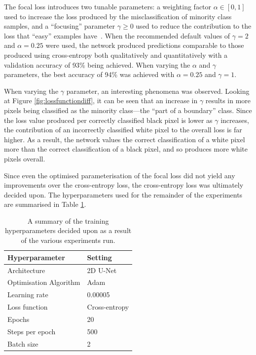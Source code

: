 The focal loss introduces two tunable parameters: a weighting factor $\alpha \in [0, 1]$ used to increase the loss produced by the misclassification of minority class samples, and a ``focusing'' parameter $\gamma \geq 0$ used to reduce the contribution to the loss that ``easy'' examples have~\cite{focalloss}. When the recommended default values of $\gamma=2$ and $\alpha=0.25$ were used, the network produced predictions comparable to those produced using cross-entropy both qualitatively and quantitatively with a validation accuracy of 93\% being achieved. When varying the $\alpha$ and $\gamma$ parameters, the best accuracy of 94\% was achieved with $\alpha=0.25$ and $\gamma=1$.

When varying the $\gamma$ parameter, an interesting phenomena was observed. Looking at Figure \ref{fig:lossfunctiondiff}, it can be seen that an increase in $\gamma$ results in more pixels being classified as the minority class---the ``part of a boundary'' class. Since the loss value produced per correctly classified black pixel is lower as $\gamma$ increases, the contribution of an incorrectly classified white pixel to the overall loss is far higher. As a result, the network values the correct classification of a white pixel more than the correct classification of a black pixel, and so produces more white pixels overall.

Since even the optimised parameterisation of the focal loss did not yield any improvements over the cross-entropy loss, the cross-entropy loss was ultimately decided upon. The hyperparameters used for the remainder of the experiments are summarised in Table \ref{tab:hyperparams1}.

\begin{table}[t]
    \centering
    \caption{A summary of the training hyperparameters decided upon as a result of the various experiments run.}
    \begin{tabular}{@{}ll@{}}
    \toprule
    Hyperparameter   & Setting      \\ \midrule
    Architecture     & 2D U-Net   \\
    Optimisation Algorithm & Adam \\
    Learning rate & 0.00005 \\
    Loss function & Cross-entropy \\
    Epochs & 20 \\
    Steps per epoch & 500 \\
    Batch size & 2 \\ \bottomrule
    \end{tabular}
    \label{tab:hyperparams1}
\end{table}

